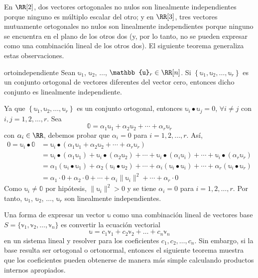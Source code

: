 En $\RR[2]$, dos vectores ortogonales no nulos son linealmente independientes porque ninguno es múltiplo escalar del otro; y en $\RR[3]$, tres vectores mutuamente ortogonales no nulos son linealmente independientes porque ninguno se encuentra en el plano de los otros dos (y, por lo tanto, no se pueden expresar como una combinación lineal de los otros dos). El siguiente teorema generaliza estas observaciones.

\begin{theorem}{}{ortoindependiente}
    Sean $\mathbb{u}_1$, $\mathbb{u}_2$, $\dots$, $\mathbb{u}_r \in \RR[n]$. Si $\left\{ \mathbb{u}_1, \mathbb{u}_2, \dots, \mathbb{u}_r \right\}$ es un conjunto ortogonal de vectores diferentes del vector cero, entonces dicho conjunto es linealmente independiente.

    \tcblower
    \demostracion Ya que $\left\{ \mathbb{u}_1, \mathbb{u}_2, \dots, \mathbb{u}_r \right\}$ es un conjunto ortogonal, entonces $\mathbb{u}_i \bullet \mathbb{u}_j = 0$, $\forall i \neq j$ con $i, j = 1, 2, \dots, r$. Sea
    $$\mathbb{0} = \alpha_1\mathbb{u}_1 + \alpha_2\mathbb{u}_2 + \cdots + \alpha_r\mathbb{u}_r$$
    con $\alpha_i \in \RR$, debemos probar que $\alpha_i = 0$ para $i = 1, 2, \dots, r$. Así,
    \begin{align*}
        0 = \mathbb{u}_i \bullet \mathbb{0} & = \mathbb{u}_i \bullet \left( \alpha_1\mathbb{u}_1 + \alpha_2\mathbb{u}_2 + \cdots + \alpha_r\mathbb{u}_r \right) \\
        & = \mathbb{u}_i \bullet ( \alpha_1\mathbb{u}_1) + \mathbb{u}_i \bullet (\alpha_2\mathbb{u}_2) + \cdots + \mathbb{u}_i \bullet (\alpha_i\mathbb{u}_i) + \cdots + \mathbb{u}_i \bullet (\alpha_r\mathbb{u}_r) \\
        & = \alpha_1 ( \mathbb{u}_i \bullet \mathbb{u}_1) + \alpha_2 (\mathbb{u}_i \bullet \mathbb{u}_2) + \cdots + \alpha_i (\mathbb{u}_i \bullet \mathbb{u}_i) + \cdots + \alpha_r (\mathbb{u}_i \bullet \mathbb{u}_r) \\
        & = \alpha_1 \cdot 0 + \alpha_2 \cdot 0 + \cdots + \alpha_i \| \mathbb{u}_i \|^2 + \cdots + \alpha_r \cdot 0
    \end{align*}
    Como $\mathbb{u}_i \neq \mathbb{0}$ por hipótesis, $\| \mathbb{u}_i \|^2 > 0$ y se tiene $\alpha_i = 0$ para $i = 1, 2, \dots, r$. Por tanto, $\mathbb{u}_1$, $\mathbb{u}_2$, $\dots$, $\mathbb{u}_r$ son linealmente independientes.
\end{theorem}

Una forma de expresar un vector $\mathbb{u}$ como una combinación lineal de vectores base $S = \{\mathbb{v}_1, \mathbb{v}_2, \dots, \mathbb{v}_n\}$ es convertir la ecuación vectorial
$$\mathbb{u} = c_1\mathbb{v}_1 + c_2\mathbb{v}_2 + \dots + c_n\mathbb{v}_n$$
en un sistema lineal y resolver para los coeficientes $c_1, c_2, \dots, c_n$. Sin embargo, si la base resulta ser ortogonal o ortonormal, entonces el siguiente teorema muestra que los coeficientes pueden obtenerse de manera más simple calculando productos internos apropiados.


